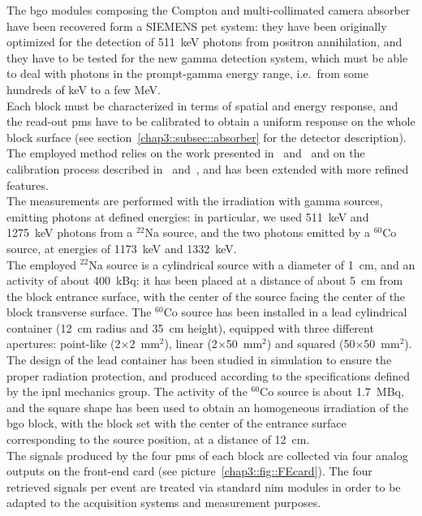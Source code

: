 The \gls{bgo} modules composing the Compton and multi-collimated camera absorber have been recovered form a SIEMENS \gls{pet} system: they have been originally optimized for the detection of 511~keV photons from positron annihilation, and they have to be tested for the new gamma detection system, which must be able to deal with photons in the prompt-gamma energy range, i.e.~from some hundreds of keV to a few MeV.\\ 
Each block must be characterized in terms of spatial and energy response, and the read-out \glspl{pm} have to be calibrated to obtain a uniform response on the whole block surface (see section~\ref{chap3::subsec::absorber} for the detector description). The employed method relies on the work presented in~\cite{Rogers1994} and~\cite{Tornai1994} and on the calibration process described in~\cite{Golnik2015} and~\cite{HuesoGonzalez2015}, and has been extended with more refined features.\\
The measurements are performed with the irradiation with gamma sources, emitting photons at defined energies: in particular, we used 511~keV and 1275~keV photons from a $^{22}$Na source, and the two photons emitted by a $^{60}$Co source, at energies of 1173~keV and 1332~keV.\\
The employed $^{22}$Na source is a cylindrical source with a diameter of 1~cm, and an activity of about 400~kBq: it has been placed at a distance of about 5~cm from the block entrance surface, with the center of the source facing the center of the block transverse surface. The $^{60}$Co source has been installed in a lead cylindrical container (12~cm radius and 35~cm height), equipped with three different apertures: point-like (2$\times$2~mm$^2$), linear (2$\times$50~mm$^2$) and squared (50$\times$50~mm$^2$). The design of the lead container has been studied in simulation to ensure the proper radiation protection, and produced according to the specifications defined by the \gls{ipnl} mechanics group. The activity of the $^{60}$Co source is about 1.7~MBq, and the square shape has been used to obtain an homogeneous irradiation of the \gls{bgo} block, with the block set with the center of the entrance surface corresponding to the source position, at a distance of 12~cm.\\
The signals produced by the four \glspl{pm} of each block are collected via four analog outputs on the front-end card (see picture~\ref{chap3::fig::FEcard}). The four retrieved signals per event are treated via standard \gls{nim} modules in order to be adapted to the acquisition systems and measurement purposes.\\
